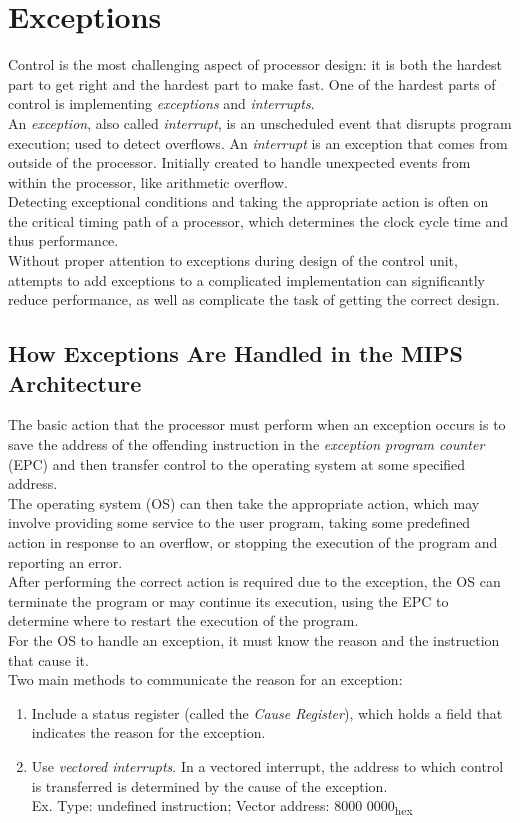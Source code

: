 \documentclass[12pt]{article}
\theoremstyle{definition}
\begin{document}
  \section{Exceptions}
  Control is the most challenging aspect of processor design: it is both the hardest part to get right and the hardest part to make fast.
  One of the hardest parts of control is implementing \emph{exceptions} and \emph{interrupts}. \\
  An \emph{exception}, also called \emph{interrupt}, is an unscheduled event that disrupts program execution; used to detect overflows.
  An \emph{interrupt} is an exception that comes from outside of the processor.
  Initially created to handle unexpected events from within the processor, like arithmetic overflow. \\

  Detecting exceptional conditions and taking the appropriate action is often on the critical timing path of a processor, which determines the clock cycle time and thus performance. \\
  Without proper attention to exceptions during design of the control unit, attempts to add exceptions to a complicated implementation can significantly reduce performance, as well as complicate the task of getting the correct design.

  \subsection{How Exceptions Are Handled in the MIPS Architecture}
  The basic action that the processor must perform when an exception occurs is to save the address of the offending instruction in the \emph{exception program counter} (EPC) and then transfer control to the operating system at some specified address. \\

  The operating system (OS) can then take the appropriate action, which may involve providing some service to the user program, taking some predefined action in response to an overflow, or stopping the execution of the program and reporting an error. \\
  After performing the correct action is required due to the exception, the OS can terminate the program or may continue its execution, using the EPC to determine where to restart the execution of the program. \\

  For the OS to handle an exception, it must know the reason and the instruction that cause it. \\
  Two main methods to communicate the reason for an exception:
  \begin{enumerate}
    \item Include a status register (called the \emph{Cause Register}), which holds a field that indicates the reason for the exception.
    \item Use \emph{vectored interrupts}. In a vectored interrupt, the address to which control is transferred is determined by the cause of the exception. \\
    Ex. Type: undefined instruction; Vector address: 8000 0000\textsubscript{hex}
  \end{enumerate}
\end{document}
